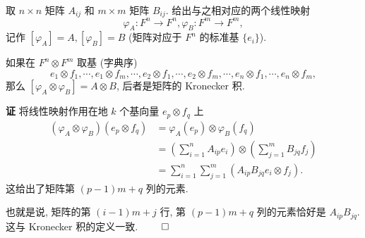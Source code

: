 \begin{example}
  \

  取 $n \times n$ 矩阵 $A_{ij}$ 和 $m \times m$ 矩阵 $B_{ij}$. 给出与之相对应的两个线性映射
  \begin{equation*}
    \varphi_A: F^n \to F^n, \varphi_B: F^m \to F^m, 
  \end{equation*}
  记作 $[\varphi_A]=A, [\varphi_B]=B$ (矩阵对应于 $F^n$ 的标准基 $\{e_i\}$). 

  如果在 $F^n \otimes F^m$ 取基 (字典序)
  \begin{equation*}
    e_1 \otimes f_1, \cdots, e_1 \otimes f_m, \cdots, e_2 \otimes f_1, \cdots, e_2 \otimes f_m, \cdots, e_n \otimes f_1, \cdots, e_n \otimes f_m,
  \end{equation*}
  那么 $[\varphi_A \otimes \varphi_B] = A \otimes B$, 后者是矩阵的 Kronecker 积.
\end{example}

\hspace{-2em}\textbf{证} \hspace{0.5em} 将线性映射作用在地 $k$ 个基向量 $e_p \otimes f_q$ 上
\begin{align*}
    (\varphi_A \otimes \varphi_B)(e_p \otimes f_q) &= \varphi_A(e_p) \otimes \varphi_B(f_q) \\
    &= \left( \sum_{i=1}^n A_{ip} e_i \right) \otimes \left( \sum_{j=1}^m B_{jq} f_j \right) \\
    &= \sum_{i=1}^n\sum_{j=1}^m \left(A_{ip}B_{jq} e_i \otimes f_j \right).
\end{align*}
这给出了矩阵第 $(p-1)m+q$ 列的元素.

也就是说, 矩阵的第 $(i-1)m+j$ 行, 第 $(p-1)m+q$ 列的元素恰好是 $A_{ip}B_{jq}$. 这与 Kronecker 积的定义一致. \hfill\(\qed\)


\newpage